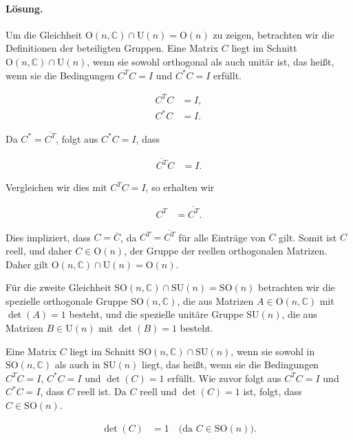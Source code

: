 \documentclass[11pt,a4paper]{article}
\begin{document}
\paragraph{Lösung.}
Um die Gleichheit $\mathrm{O}(n, \mathbb{C}) \cap \mathrm{U}(n) = \mathrm{O}(n)$ zu zeigen, betrachten wir die Definitionen der beteiligten Gruppen. Eine Matrix $C$ liegt im Schnitt $\mathrm{O}(n, \mathbb{C}) \cap \mathrm{U}(n)$, wenn sie sowohl orthogonal als auch unitär ist, das heißt, wenn sie die Bedingungen $C^T C = I$ und $C^* C = I$ erfüllt. 

\begin{align*}
C^T C &= I, \\
C^* C &= I.
\end{align*}

Da $C^* = \overline{C^T}$, folgt aus $C^* C = I$, dass

\begin{align*}
\overline{C^T} C &= I.
\end{align*}

Vergleichen wir dies mit $C^T C = I$, so erhalten wir

\begin{align*}
C^T &= \overline{C^T}.
\end{align*}

Dies impliziert, dass $C = \overline{C}$, da $C^T = \overline{C^T}$ für alle Einträge von $C$ gilt. Somit ist $C$ reell, und daher $C \in \mathrm{O}(n)$, der Gruppe der reellen orthogonalen Matrizen. Daher gilt $\mathrm{O}(n, \mathbb{C}) \cap \mathrm{U}(n) = \mathrm{O}(n)$.

Für die zweite Gleichheit $\mathrm{SO}(n, \mathbb{C}) \cap \mathrm{SU}(n) = \mathrm{SO}(n)$ betrachten wir die spezielle orthogonale Gruppe $\mathrm{SO}(n, \mathbb{C})$, die aus Matrizen $A \in \mathrm{O}(n, \mathbb{C})$ mit $\det(A) = 1$ besteht, und die spezielle unitäre Gruppe $\mathrm{SU}(n)$, die aus Matrizen $B \in \mathrm{U}(n)$ mit $\det(B) = 1$ besteht.

Eine Matrix $C$ liegt im Schnitt $\mathrm{SO}(n, \mathbb{C}) \cap \mathrm{SU}(n)$, wenn sie sowohl in $\mathrm{SO}(n, \mathbb{C})$ als auch in $\mathrm{SU}(n)$ liegt, das heißt, wenn sie die Bedingungen $C^T C = I$, $C^* C = I$ und $\det(C) = 1$ erfüllt. Wie zuvor folgt aus $C^T C = I$ und $C^* C = I$, dass $C$ reell ist. Da $C$ reell und $\det(C) = 1$ ist, folgt, dass $C \in \mathrm{SO}(n)$.

\begin{align*}
\det(C) &= 1 \quad \text{(da $C \in \mathrm{SO}(n)$)}.
\end{align*}
\end{document}
